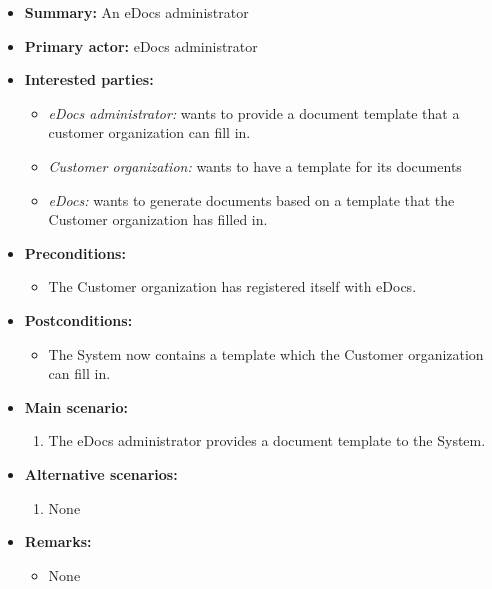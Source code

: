 \documentclass[a4paper,10pt]{article}
\begin{document}
\begin{itemize}
	\item \textbf{Summary:} An eDocs administrator
    \item \textbf{Primary actor:} eDocs administrator
    \item \textbf{Interested parties:} 
        \begin{itemize}
        	\item \textit{eDocs administrator:} wants to provide a document template that a customer organization can fill in.
            \item \textit{Customer organization:} wants to have a template for its documents
            \item \textit{eDocs:} wants to generate documents based on a template that the Customer organization has filled in.
        \end{itemize}

    \item \textbf{Preconditions:}
        \begin{itemize}
            \item The Customer organization has registered itself with eDocs.
        \end{itemize}

    \item \textbf{Postconditions:}
        \begin{itemize}
            \item The System now contains a template which the Customer organization can fill in.
        \end{itemize}
        
    \item \textbf{Main scenario:} 
    \begin{enumerate}
		\item The eDocs administrator provides a document template to the System.
    \end{enumerate}

    \item \textbf{Alternative scenarios:} 
    \begin{enumerate}
    	\item None
    \end{enumerate}
    
    \item \textbf{Remarks:}
        \begin{itemize}
        	\item None
        \end{itemize}
\end{itemize}
\end{document}
